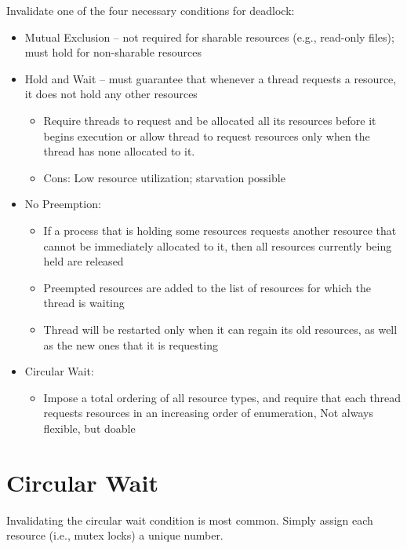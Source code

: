 Invalidate one of the four necessary conditions for deadlock:

\begin{itemize}
    \item Mutual Exclusion – not required for sharable resources (e.g., read-only files); must hold for non-sharable resources
    \item Hold and Wait – must guarantee that whenever a thread requests a resource, it does not hold any other resources

    \begin{itemize}
        \item Require threads to request and be allocated all its resources before it begins execution or allow thread to request resources only when the thread has none allocated to it.
        \item Cons: Low resource utilization; starvation possible
    \end{itemize}

    \item No Preemption:

    \begin{itemize}
        \item If a process that is holding some resources requests another
resource that cannot be immediately allocated to it, then all
resources currently being held are released
        \item Preempted resources are added to the list of resources for which
the thread is waiting
        \item Thread will be restarted only when it can regain its old resources,
as well as the new ones that it is requesting
    \end{itemize}

    \item Circular Wait:

    \begin{itemize}
        \item Impose a total ordering of all resource types, and require that each
thread requests resources in an increasing order of enumeration, Not always flexible, but doable
    \end{itemize}
\end{itemize}


\section{Circular Wait}
Invalidating the circular wait condition is most common. Simply assign each resource (i.e., mutex locks) a unique number.

